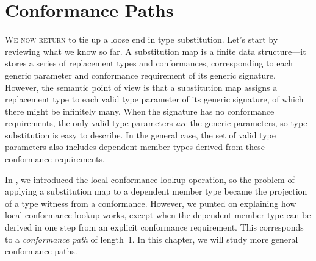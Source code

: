 \documentclass[../generics]{subfiles}
\begin{document}
\newcommand{\NormalConformance}[3]{
\begin{tabularx}{\textwidth}{lcX}
\toprule
$\clubsuit\;\ConfReq{#1}{#2}$\\
\midrule
#3
\end{tabularx}}
\newcommand{\AssocTypeDef}[3]{$\AssocType{#1}{#2}$&$\mapsto$&\texttt{#3}}
\newcommand{\AssocConfDef}[3]{$\AssocConf{#1}{#3}$&$\mapsto$&\ConfReq{#2}{#3}}

\newcommand{\StringCollection}{\ConfReq{String}{Collection}}
\newcommand{\SubstringCollection}{\ConfReq{Substring}{Collection}}
\newcommand{\StringSequence}{\ConfReq{String}{Sequence}}
\newcommand{\SubstringSequence}{\ConfReq{Substring}{Sequence}}

\newcommand{\TauN}{\ConfReq{$\uptau$}{N}}

\newcommand{\TPOne}{\ConfReq{$\tT_1$}{$\tP_1$}}

\newcommand{\XN}{\ConfReq{X}{N}}

\newcommand{\SN}{\ConfReq{S}{N}}
\newcommand{\FN}{\ConfReq{F<$\uptau$>}{N}}
\newcommand{\HN}{\ConfReq{H<$\uptau$>}{N}}

\newcommand{\SigmaS}{\Sigma_\texttt{S}}
\newcommand{\SigmaF}{\Sigma_\texttt{F}}

\newcommand{\SelfAToN}{\AssocConf{Self.A}{N}}

\chapter{Conformance Paths}\label{chap:conformance paths}

\lettrine{W}{e now return} to tie up a loose end in type substitution. Let's start by reviewing what we know so far. A substitution map is a finite data structure---it stores a series of replacement types and conformances, corresponding to each generic parameter and conformance requirement of its generic signature. However, the semantic point of view is that a substitution map assigns a replacement type to each valid type parameter of its generic signature, of which there might be infinitely many. When the signature has no conformance requirements, the only valid type parameters \emph{are} the generic parameters, so type substitution is easy to describe. In the general case, the set of valid type parameters also includes dependent member types derived from these conformance requirements.

In , we introduced the local conformance lookup operation, so the problem of applying a substitution map to a dependent member type became the projection of a type witness from a conformance. However, we punted on explaining how local conformance lookup works, except when the dependent member type can be derived in one step from an explicit conformance requirement. This corresponds to a \emph{conformance path} of length~1. In this chapter, we will study more general conformance paths.
\end{document}
